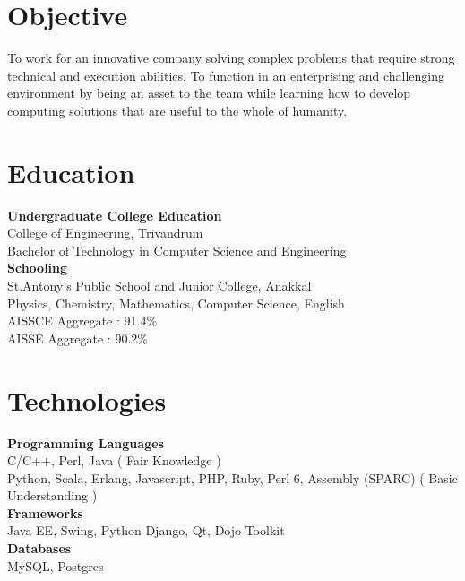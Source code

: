 \documentclass[line,margin]{res}
\begin{document}


\address{joji\_antony@gmx.com}
\address{+91 96323 41954}

\begin{resume}
\section{Objective}
To work for an innovative company solving complex problems that require strong technical and execution abilities. To function in an enterprising and challenging environment by being an asset to the team while learning how to develop computing solutions that are useful to the whole of humanity.\\

\section{Education}

{\bf Undergraduate College Education}\\
College of Engineering, Trivandrum\\
Bachelor of Technology in Computer Science and Engineering\\

{\bf Schooling} \\
St.Antony's Public School and Junior College, Anakkal\\
Physics, Chemistry, Mathematics, Computer Science, English\\

AISSCE Aggregate : 91.4\%\\
AISSE Aggregate : 90.2\%\\

\section{Technologies}

{\bf Programming Languages}\\
C/C++, Perl, Java ( Fair Knowledge )\\
Python, Scala, Erlang, Javascript, PHP, Ruby, Perl 6, Assembly (SPARC) ( Basic Understanding )\\

{\bf Frameworks}\\
Java EE, Swing, Python Django, Qt, Dojo Toolkit\\

{\bf Databases}\\
MySQL, Postgres\\


\end{resume}
\end{document}
